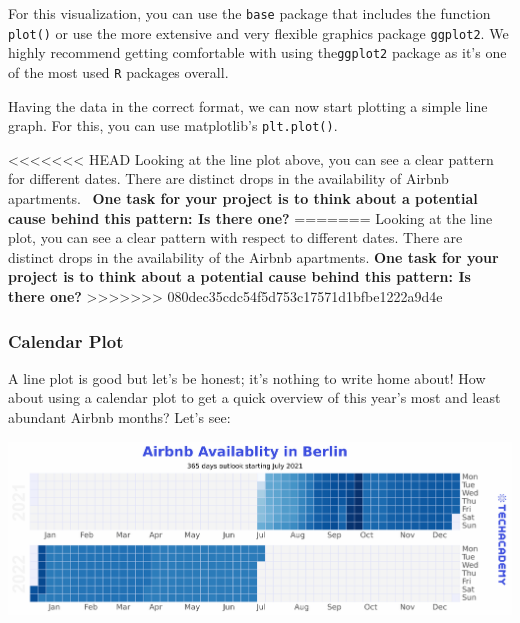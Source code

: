 \documentclass[
  11pt,
]{article}
\newenvironment{tips}[1]
  {
  \begin{itemize}
  \footnotesize
  \renewcommand{\labelitemi}{
    \raisebox{-.7\height}[0pt][0pt]{
      {\setkeys{Gin}{width=3em,keepaspectratio}
        \texttt{[image: images/\#1.png]}}
    }
  }
  \setlength{\fboxsep}{1em}
  \begin{rbox}
  \item
  }
  {
  \end{rbox}
  \end{itemize}
  }
\newenvironment{tipsp}[1]
  {
  \begin{itemize}
  \footnotesize
  \renewcommand{\labelitemi}{
    \raisebox{-.7\height}[0pt][0pt]{
      {\setkeys{Gin}{width=3em,keepaspectratio}
        \texttt{[image: images/\#1.png]}}
    }
  }
  \setlength{\fboxsep}{1em}
  \begin{pbox}
  \item
  }
  {
  \end{pbox}
  \end{itemize}
  }
\begin{document}
\begin{tips}r
For this visualization, you can use the \texttt{base} package that includes the function \texttt{plot()} or use the more extensive and very flexible graphics package \texttt{ggplot2}.
We highly recommend getting comfortable with using the\texttt{ggplot2} package as it's one of the most used \texttt{R} packages overall.

\end{tips}

\begin{tipsp}p
Having the data in the correct format, we can now start plotting a simple line graph.
For this, you can use matplotlib's \texttt{plt.plot()}.

\end{tipsp}

<<<<<<< HEAD
Looking at the line plot above, you can see a clear pattern for different dates.
There are distinct drops in the availability of Airbnb apartments.~
\textbf{One task for your project is to think about a potential cause behind this pattern: Is there one?}
=======
Looking at the line plot, you can see a clear pattern with respect to different dates. There are distinct drops in the availability of the Airbnb apartments. \textbf{One task for your project is to think about a potential cause behind this pattern: Is there one?}
>>>>>>> 080dec35cdc54f5d753c17571d1bfbe1222a9d4e

\hypertarget{calendar-plot}{%
\subsubsection{Calendar Plot}\label{calendar-plot}}

A line plot is good but let's be honest; it's nothing to write home about!
How about using a calendar plot to get a quick overview of this year's most and least abundant Airbnb months?
Let's see:

\begin{center}\includegraphics[width=1\linewidth]{plot/01_python/calendar} \end{center}
\end{document}
